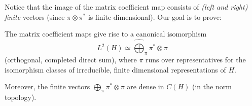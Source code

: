 Notice that the image of the matrix coefficient map consists of \emph{(left and right) finite} vectors (since $\pi\otimes\pi^*$ is finite dimensional). Our goal is to prove:

\begin{theorem}
\label{theorem-PeterWeyl}
The matrix coefficient maps give rise to a canonical isomorphism
\begin{equation}
 \label{equation-PeterWeyl}
 L^2(H)\simeq \hat\bigoplus_\pi \pi^*\otimes \pi
\end{equation}
(orthogonal, completed direct sum),
where $\pi$ runs over representatives for the isomorphism classes of irreducible, finite dimensional representations of $H$.

Moreover, the finite vectors $\bigoplus_\pi \pi^*\otimes \pi$ are dense in $C(H)$ (in the norm topology).
\end{theorem}


